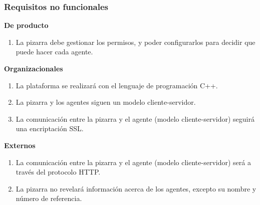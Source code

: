 \subsubsection{Requisitos no funcionales}
\textbf{De producto}
	\begin{enumerate}
		\item La pizarra debe gestionar los permisos, y poder configurarlos para decidir que puede hacer cada agente.
	\end{enumerate}
\textbf{Organizacionales}
	\begin{enumerate}
		\item La plataforma se realizará con el lenguaje de programación C++.
		\item La pizarra y los agentes siguen un modelo cliente-servidor.
		\item La comunicación entre la pizarra y el agente (modelo cliente-servidor) seguirá una encriptación SSL.
	\end{enumerate}
\textbf{Externos}
	\begin{enumerate}
		\item La comunicación entre la pizarra y el agente (modelo cliente-servidor) será a través del protocolo HTTP.
		\item La pizarra no revelará información acerca de los agentes, excepto su nombre y número de referencia.
	\end{enumerate}